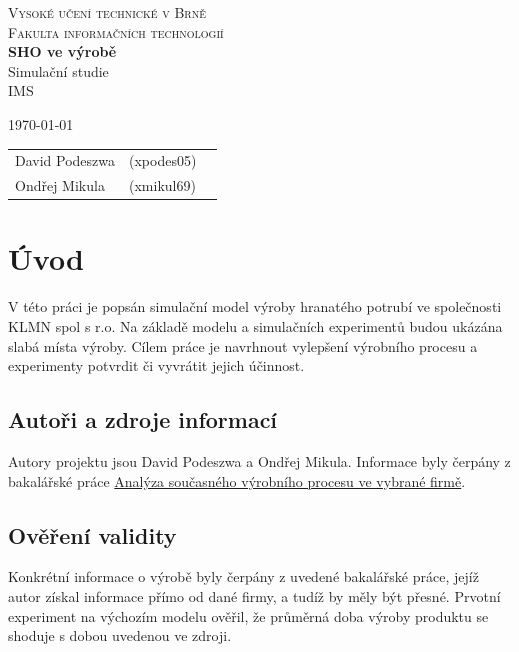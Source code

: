 \documentclass[11pt, a4paper]{article}
\begin{document}
\begin{titlepage}
\begin{center}
\Huge
\textsc{Vysoké učení technické v Brně}\\
\huge
\textsc{Fakulta informačních technologií}\\
\LARGE
{\bf SHO ve výrobě}\\Simulační studie\\IMS
{}
\end{center}
\Large
\today\hfill
\begin{tabular}{l l l}
		David Podeszwa & (xpodes05)\\
		Ondřej Mikula & (xmikul69)\\
\end{tabular}
\end{titlepage}

\newpage
\tableofcontents
\newpage


\section{Úvod}
V této práci je popsán simulační model\cite[str. 10]{ims} výroby hranatého potrubí ve společnosti KLMN spol s r.o. Na základě modelu a simulačních experimentů\cite[str. 33]{ims} budou ukázána slabá místa výroby. Cílem práce je  navrhnout vylepšení výrobního procesu a
experimenty potvrdit či vyvrátit jejich účinnost.

\subsection{Autoři a zdroje informací}
Autory projektu jsou David Podeszwa a Ondřej Mikula. Informace byly čerpány z bakalářské práce \href{http://digilib.k.utb.cz/bitstream/handle/10563/22155/%20ih%C3%A1k_2012_bp.pdf?sequence=1}{Analýza současného výrobního procesu ve
vybrané firmě}\cite{bp}.

\subsection{Ověření validity}
Konkrétní informace o výrobě byly čerpány z uvedené bakalářské práce, jejíž autor získal informace přímo od dané firmy, a tudíž by měly být přesné. Prvotní experiment na výchozím modelu ověřil\cite[str. 10]{ims}, že průměrná doba výroby produktu se shoduje s dobou uvedenou ve zdroji.
\end{document}
